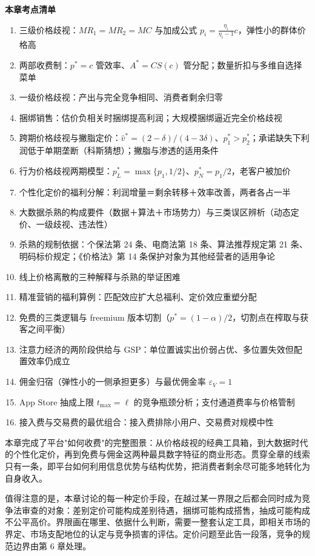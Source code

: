 \begin{chapterbox}
\textbf{本章考点清单}

\begin{enumerate}
\item 三级价格歧视：$MR_1 = MR_2 = MC$ 与加成公式 $p_i = \frac{\eta_i}{\eta_i-1}c$，弹性小的群体价格高 
\item 两部收费制：$p^* = c$ 管效率、$A^* = CS(c)$ 管分配；数量折扣与多维自选择菜单 
\item 一级价格歧视：产出与完全竞争相同、消费者剩余归零 
\item 捆绑销售：估价负相关时捆绑提高利润；大规模捆绑逼近完全价格歧视 
\item 跨期价格歧视与撇脂定价：$\hat v^* = (2-\delta)/(4-3\delta)$、$p_1^* > p_2^*$；承诺缺失下利润低于单期垄断（科斯猜想）；撇脂与渗透的适用条件 
\item 行为价格歧视两期模型：$p_L^* = \max\{p_1, 1/2\}$、$p_N^* = p_1/2$，老客户被加价 
\item 个性化定价的福利分解：利润增量＝剩余转移＋效率改善，两者各占一半 
\item 大数据杀熟的构成要件（数据＋算法＋市场势力）与三类误区辨析（动态定价、一级歧视、违法性）
\item 杀熟的规制依据：个保法第 24 条、电商法第 18 条、算法推荐规定第 21 条、明码标价规定；《价格法》第 14 条保护对象为其他经营者的适用争论 
\item 线上价格离散的三种解释与杀熟的举证困难 
\item 精准营销的福利算例：匹配效应扩大总福利、定价效应重塑分配 
\item 免费的三类逻辑与 freemium 版本切割（$p^* = (1-\alpha)/2$，切割点在榨取与获客之间平衡）
\item 注意力经济的两阶段供给与 GSP：单位置诚实出价弱占优、多位置失效但配置效率仍成立 
\item 佣金归宿（弹性小的一侧承担更多）与最优佣金率 $\varepsilon_V = 1$ 
\item App Store 抽成上限 $t_{\max} = \ell$ 的竞争瓶颈分析；支付通道费率与价格管制 
\item 接入费与交易费的最优组合：接入费排除小用户、交易费对规模中性 
\end{enumerate}
\end{chapterbox}

本章完成了平台"如何收费"的完整图景：从价格歧视的经典工具箱，到大数据时代的个性化定价，再到免费与佣金这两种最具数字特征的商业形态。贯穿全章的线索只有一条，即平台如何利用信息优势与结构优势，把消费者剩余尽可能多地转化为自身收入。

值得注意的是，本章讨论的每一种定价手段，在越过某一界限之后都会同时成为竞争法审查的对象：差别定价可能构成差别待遇，捆绑可能构成搭售，抽成可能构成不公平高价。界限画在哪里、依据什么判断，需要一整套认定工具，即相关市场的界定、市场支配地位的认定与竞争损害的评估。定价问题至此告一段落，竞争的规范边界由第 6 章处理。
